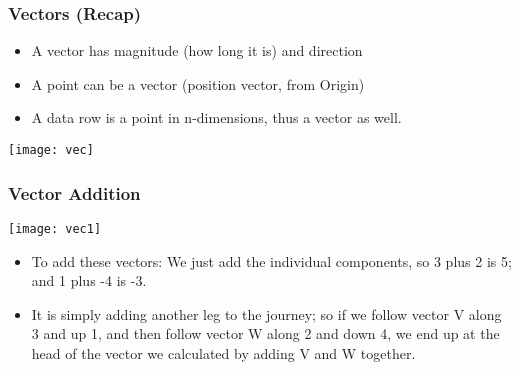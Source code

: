 \begin{frame}[fragile]\frametitle{Vectors (Recap)}
\begin{itemize}
\item A vector has magnitude (how long it is) and direction
\item A point can be a vector (position vector, from Origin)
\item A data row is a point in n-dimensions, thus a vector as well.
\end{itemize}
\begin{center}
\texttt{[image: vec]}
\end{center}
\end{frame}

 \begin{frame}[fragile] \frametitle{Vector Addition}

\begin{center}
\texttt{[image: vec1]}
\end{center}

\begin{itemize}
\item To add these vectors: We just add the individual components, so 3 plus 2
is 5; and 1 plus -4 is -3.
\item It is simply adding another leg to the journey; so if
we follow vector V along 3 and up 1, and then follow vector W along 2 and down 4,
we end up at the head of the vector we calculated by adding V and
W together.
\end{itemize}

\end{frame}


